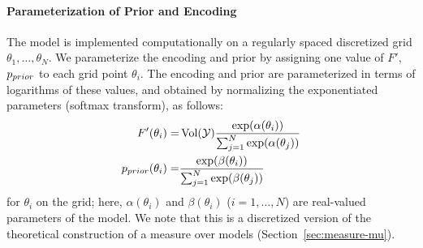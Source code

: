 \paragraph*{Parameterization of Prior and Encoding}
The model is implemented computationally on a regularly spaced discretized grid $\theta_1, \dots, \theta_N$.
We parameterize the encoding and prior by assigning one value of $F'$, $p_{prior}$ to each grid point $\theta_i$.
The encoding and prior are parameterized in terms of logarithms of these values, and obtained by normalizing the exponentiated parameters (softmax transform), as follows:
\begin{align}\label{eq:fprime-param}
	F'(\theta_i) =& \operatorname{Vol}(\mathcal{Y}) \frac{\exp(\alpha(\theta_i))}{\sum_{j=1}^N\exp(\alpha(\theta_j))} \\
\label{eq:prior-param}
		p_{prior}(\theta_i) =& \frac{\exp(\beta(\theta_i))}{\sum_{j=1}^N\exp(\beta(\theta_j))}
\end{align}
for $\theta_i$ on the grid; here, $\alpha(\theta_i)$ and $\beta(\theta_i)$ ($i=1,\dots, N$) are real-valued parameters of the model. 
We note that this is a discretized version of the theoretical construction of a measure over models (Section~\ref{sec:measure-mu}).

